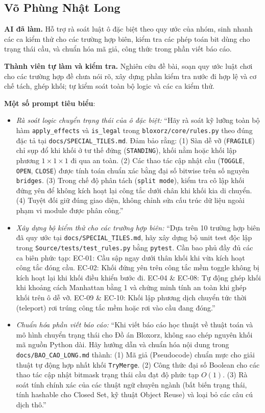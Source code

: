 \subsection*{Võ Phùng Nhật Long}

\textbf{AI đã làm.} Hỗ trợ rà soát luật ô đặc biệt theo quy ước của nhóm, sinh nhanh các ca kiểm thử cho các trường hợp biên, kiểm tra các phép toán bit dùng cho trạng thái cầu, và chuẩn hóa mã giả, công thức trong phần viết báo cáo.

\textbf{Thành viên tự làm và kiểm tra.} Nghiên cứu đề bài, soạn quy ước luật chơi cho các trường hợp đề chưa nói rõ, xây dựng phần kiểm tra nước đi hợp lệ và cơ chế tách, ghép khối; tự kiểm soát toàn bộ logic và các ca kiểm thử.

\textbf{Một số prompt tiêu biểu}:
\begin{itemize}
\item \emph{Rà soát logic chuyển trạng thái của ô đặc biệt:} ``Hãy rà soát kỹ lưỡng toàn bộ hàm \texttt{apply\_effects} và \texttt{is\_legal} trong \texttt{bloxorz/core/rules.py} theo đúng đặc tả tại \texttt{docs/SPECIAL\_TILES.md}. Đảm bảo rằng:
(1) Sàn dễ vỡ (\texttt{FRAGILE}) chỉ sụp đổ khi khối ở tư thế đứng (\texttt{STANDING}), khối nằm hoặc khối lập phương $1 \times 1 \times 1$ đi qua an toàn.
(2) Các thao tác cập nhật cầu (\texttt{TOGGLE}, \texttt{OPEN}, \texttt{CLOSE}) được tính toán chuẩn xác bằng đại số bitwise trên số nguyên \texttt{bridges}.
(3) Trong chế độ phân tách (\texttt{split mode}), kiểm tra cô lập khối đứng yên để không kích hoạt lại công tắc dưới chân khi khối kia di chuyển.
(4) Tuyệt đối giữ đúng giao diện, không chỉnh sửa cấu trúc dữ liệu ngoài phạm vi module được phân công.''
\item \emph{Xây dựng bộ kiểm thử cho các trường hợp biên:} ``Dựa trên 10 trường hợp biên đã quy ước tại \texttt{docs/SPECIAL\_TILES.md}, hãy xây dựng bộ unit test độc lập trong \texttt{Source/tests/test\_rules.py} bằng \texttt{pytest}. Cần bao phủ đầy đủ các ca biên phức tạp:
EC-01: Cầu sập ngay dưới thân khối khi vừa kích hoạt công tắc đóng cầu.
EC-02: Khối đứng yên trên công tắc mềm toggle không bị kích hoạt lại khi khối điều khiển bước đi.
EC-04 \& EC-08: Tự động ghép khối khi khoảng cách Manhattan bằng 1 và chứng minh tính an toàn khi ghép khối trên ô dễ vỡ.
EC-09 \& EC-10: Khối lập phương dịch chuyển tức thời (teleport) rơi trúng công tắc mềm hoặc rơi vào cầu đang đóng.''
\item \emph{Chuẩn hóa phần viết báo cáo:} ``Khi viết báo cáo học thuật về thuật toán và mô hình chuyển trạng thái cho Đồ án Bloxorz, không sao chép nguyên khối mã nguồn Python dài. Hãy hướng dẫn và chuẩn hóa nội dung trong \texttt{docs/BAO\_CAO\_LONG.md} thành:
(1) Mã giả (Pseudocode) chuẩn mực cho giải thuật tự động hợp nhất khối \texttt{TryMerge}.
(2) Công thức đại số Boolean cho các thao tác cập nhật bitmask trạng thái cầu đạt độ phức tạp $O(1)$.
(3) Rà soát tính chính xác của các thuật ngữ chuyên ngành (bất biến trạng thái, tính hashable cho Closed Set, kỹ thuật Object Reuse) và loại bỏ các câu cú dịch thô.''
\end{itemize}

